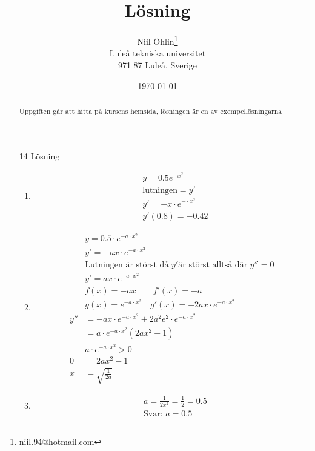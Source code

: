 \documentclass[a4paper]{article}
\begin{document}
\title{Lösning}
\author{Niil Öhlin\footnote{niil.94@hotmail.com}\\
	Luleå tekniska universitet\\
	971 87 Luleå, Sverige
}
\date{\today}
\maketitle
\begin{abstract}
	Uppgiften går att hitta på kursens hemsida, lösningen är en av
	exempellösningarna
\end{abstract}

\newcommand{\ex}[1]{
	e^{-#1 \cdot x^2}
}
\newcommand{\eax} {
	\ex{a}
}
\begin{enumerate}
	\item[14] Lösning
		\begin{enumerate}
			\item 
				\begin{align*}
					&y = 0.5 e^{-x^2} \\
					&\text{lutningen}  = y' \\
					&y' = - x \cdot \ex{} \\
					&y'(0.8) = - 0.42 
				\end{align*}
			\item 
				\begin{align*}
					&y = 0.5 \cdot \eax \\
					&y' = -ax \cdot \eax \\
					&\text{Lutningen är störst då } y' 
							\text{är störst alltså där } y'' = 0 \\
					&y' = ax \cdot \eax \\
					&f(x) = -ax \qquad   f'(x) = -a \\
					&g(x) = \eax  \quad g'(x) = -2ax \cdot \eax \\
					y'' &= -ax \cdot \eax + 2 a^2 e^2 \cdot \eax \\
					&= a \cdot \eax(2ax^2 -1) \\
					&a \cdot \eax > 0 \\
					0 &= 2ax^2 - 1 \\
					x &= \sqrt{\frac 1 {2a}}
				\end{align*}
			\item
				\begin{align*}
					&a = \frac 1 {2x^2} = \frac 1 2 = 0.5 \\
					&\text{Svar: } a = 0.5
				\end{align*}
		\end{enumerate}
\end{enumerate}
\end{document}
